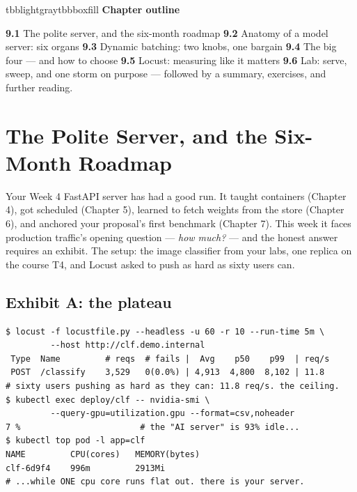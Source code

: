 \vspace{3.5pt}

\begin{calloutbox}{tbblightgray}{tbbboxfill}
{\normalsize\bfseries\color{tbbink}Chapter outline}\par\vspace{3pt}
\textbf{9.1} The polite server, and the six-month roadmap    \textbf{9.2} Anatomy of a model server: six organs    \textbf{9.3} Dynamic batching: two knobs, one bargain    \textbf{9.4} The big four — and how to choose    \textbf{9.5} Locust: measuring like it matters    \textbf{9.6} Lab: serve, sweep, and one storm on purpose — followed by a summary, exercises, and further reading.
\end{calloutbox}

\section{The Polite Server, and the Six-Month Roadmap}

Your Week 4 FastAPI server has had a good run. It taught containers (Chapter 4), got scheduled (Chapter 5), learned to fetch weights from the store (Chapter 6), and anchored your proposal's first benchmark (Chapter 7). This week it faces production traffic's opening question — \textit{how much?} — and the honest answer requires an exhibit. The setup: the image classifier from your labs, one replica on the course T4, and Locust asked to push as hard as sixty users can.

\subsection*{Exhibit A: the plateau}

\begin{terminalbox}
\begin{Verbatim}[breaklines=true,breakanywhere=true,fontsize=\small,formatcom=\color{tbbtermfg},codes=\tbbcodeactive]
$ locust -f locustfile.py --headless -u 60 -r 10 --run-time 5m \
         --host http://clf.demo.internal
 Type  Name         # reqs  # fails |  Avg    p50    p99  | req/s
 POST  /classify    3,529   0(0.0%) | 4,913  4,800  8,102 | 11.8
# sixty users pushing as hard as they can: 11.8 req/s. the ceiling.
$ kubectl exec deploy/clf -- nvidia-smi \
         --query-gpu=utilization.gpu --format=csv,noheader
7 %                        # the "AI server" is 93% idle...
$ kubectl top pod -l app=clf
NAME         CPU(cores)   MEMORY(bytes)
clf-6d9f4    996m         2913Mi
# ...while ONE cpu core runs flat out. there is your server.
\end{Verbatim}
\end{terminalbox}


